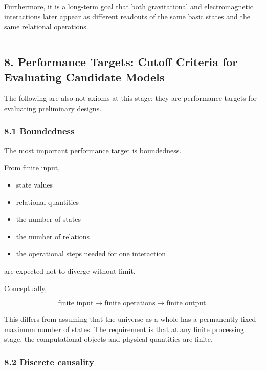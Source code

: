 \documentclass[
  a4paper,
]{article}
\providecommand{\tightlist}{%
  \setlength{\itemsep}{0pt}\setlength{\parskip}{0pt}}
\begin{document}
Furthermore, it is a long-term goal that both gravitational and
electromagnetic interactions later appear as different readouts of the
same basic states and the same relational operations.

\begin{center}\rule{0.5\linewidth}{0.5pt}\end{center}

\subsection{8. Performance Targets: Cutoff Criteria for Evaluating
Candidate
Models}\label{performance-targets-cutoff-criteria-for-evaluating-candidate-models}

The following are also not axioms at this stage; they are performance
targets for evaluating preliminary designs.

\subsubsection{8.1 Boundedness}\label{boundedness}

The most important performance target is boundedness.

From finite input,

\begin{itemize}
\tightlist
\item
  state values
\item
  relational quantities
\item
  the number of states
\item
  the number of relations
\item
  the operational steps needed for one interaction
\end{itemize}

are expected not to diverge without limit.

Conceptually,

\[
\boxed{
\text{finite input}
\rightarrow
\text{finite operations}
\rightarrow
\text{finite output.}
}
\]

This differs from assuming that the universe as a whole has a
permanently fixed maximum number of states. The requirement is that at
any finite processing stage, the computational objects and physical
quantities are finite.

\subsubsection{8.2 Discrete causality}\label{discrete-causality}
\end{document}
